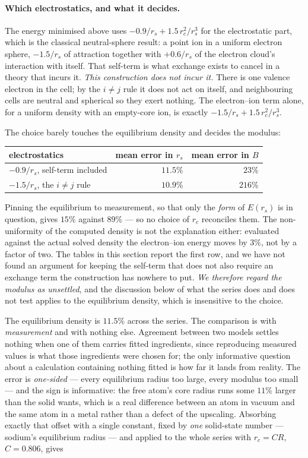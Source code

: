 \documentclass[11pt]{article}
\begin{document}
\paragraph{Which electrostatics, and what it decides.} The energy minimised above uses
$-0.9/r_s + 1.5\,r_c^2/r_s^3$ for the electrostatic part, which is the classical neutral-sphere
result: a point ion in a uniform electron sphere, $-1.5/r_s$ of attraction together with $+0.6/r_s$
of the electron cloud's interaction with itself. That self-term is what exchange exists to cancel in
a theory that incurs it. \emph{This construction does not incur it.} There is one valence electron
in the cell; by the $i\neq j$ rule it does not act on itself, and neighbouring cells are neutral and
spherical so they exert nothing. The electron--ion term alone, for a uniform density with an
empty-core ion, is exactly $-1.5/r_s + 1.5\,r_c^2/r_s^3$.

The choice barely touches the equilibrium density and decides the modulus:

\begin{center}
\begin{tabular}{lrr}
\toprule
electrostatics & mean error in $r_s$ & mean error in $B$ \\
\midrule
$-0.9/r_s$, self-term included & $11.5\%$ & $23\%$ \\
$-1.5/r_s$, the $i\neq j$ rule & $10.9\%$ & $216\%$ \\
\bottomrule
\end{tabular}
\end{center}

\noindent Pinning the equilibrium to measurement, so that only the \emph{form} of $E(r_s)$ is in
question, gives $15\%$ against $89\%$ --- so no choice of $r_c$ reconciles them. The
non-uniformity of the computed density is not the explanation either: evaluated against the actual
solved density the electron--ion energy moves by $3\%$, not by a factor of two. The tables in this
section report the first row, and we have not found an argument for keeping the self-term that does
not also require an exchange term the construction has nowhere to put. \emph{We therefore regard the
modulus as unsettled}, and the discussion below of what the series does and does not test applies to
the equilibrium density, which is insensitive to the choice.

\noindent The equilibrium density is $11.5\%$ across the series. The comparison is with
\emph{measurement} and with nothing else. Agreement between two models settles nothing when one of
them carries fitted ingredients, since reproducing measured values is what those ingredients were
chosen for; the only informative question about a calculation containing nothing fitted is how far
it lands from reality. The error is \emph{one-sided} --- every equilibrium radius too large,
every modulus too small --- and the sign is informative: the free atom's core radius runs some
$11\%$ larger than the solid wants, which is a real difference between an atom in vacuum and the
same atom in a metal rather than a defect of the upscaling. Absorbing exactly that offset with a
single constant, fixed by \emph{one} solid-state number --- sodium's equilibrium radius --- and
applied to the whole series with $r_c=CR$, $C=0.806$, gives
\end{document}
